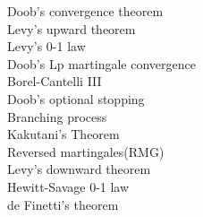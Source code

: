 \documentclass[paper=a4, fontsize=11pt]{scrartcl} %
\numberwithin{equation}{section} %
\numberwithin{figure}{section} %
\numberwithin{table}{section} %
\begin{document}
Doob's convergence theorem\\
Levy's upward theorem\\
Levy's 0-1 law\\
Doob's Lp martingale convergence\\
Borel-Cantelli III\\
Doob's optional stopping\\
Branching process\\
Kakutani's Theorem\\
Reversed martingales(RMG)\\
Levy's downward theorem\\
Hewitt-Savage 0-1 law\\
de Finetti's theorem\\
\end{document}
